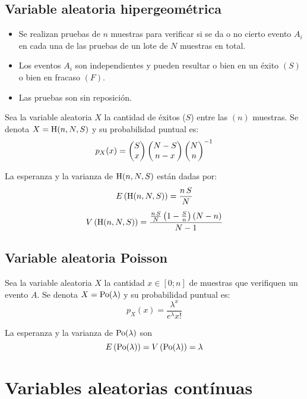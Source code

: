 \subsection{Variable aleatoria hipergeométrica}

\begin{itemize}
\item Se realizan pruebas de $n$ muestras para verificar si se da o no cierto evento $A_i$ en cada una de las pruebas de un lote de $N$ muestras en total.

\item Los eventos $A_i$ son independientes y pueden resultar o bien en un éxito $(S)$ o bien en fracaso $(F)$.

\item Las pruebas son sin reposición.
\end{itemize}

Sea la variable aleatoria $X$ la cantidad de éxitos ($S$) entre las $(n)$ muestras.
Se denota $X=\operatorname{H}(n,N,S)$ y su probabilidad puntual es:
\begin{equation*}
    p_X(x) = \begin{pmatrix} {S}\\{x} \end{pmatrix} \begin{pmatrix} {N-S}\\{n-x} \end{pmatrix} \begin{pmatrix} {N}\\{n} \end{pmatrix}^{-1}
\end{equation*}

La esperanza y la varianza de $\operatorname{H}(n,N,S)$ están dadas por:
\begin{gather*}
    E \left(\operatorname{H}(n,N,S)\right) = \frac{n \, S}{N}
    \\[1ex]
    V \left(\operatorname{H}(n,N,S)\right) = \frac{\frac{n \, S}{N} \left(1- \frac{S}{n}\right) (N-n)}{N-1}
\end{gather*}


\subsection{Variable aleatoria Poisson}

Sea la variable aleatoria $X$ la cantidad $x \in [0;n]$ de muestras que verifiquen un evento $A$.
Se denota $X=\operatorname{Po}(\lambda)$ y su probabilidad puntual es:
\begin{equation*}
    p_X(x) = \frac{\lambda^x}{e^\lambda x!}
\end{equation*}

La esperanza y la varianza de $\operatorname{Po}(\lambda)$ son
\begin{equation*}
    E \left(\operatorname{Po}(\lambda)\right) = V \left(\operatorname{Po}(\lambda)\right) = \lambda
\end{equation*}


\section{Variables aleatorias contínuas}

